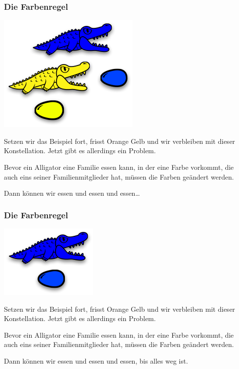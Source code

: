 \documentclass{beamer}
\begin{document}

\begin{frame}
\frametitle{Die Farbenregel}

\begin{center}
\includegraphics[scale=0.35]{colorrule_4.png} 
\end{center}

Setzen wir das Beispiel fort, frisst Orange Gelb und wir verbleiben mit dieser Konstellation.
Jetzt gibt es allerdings ein Problem.

Bevor ein Alligator eine Familie essen kann, in der eine Farbe vorkommt, die auch eins seiner Familienmitglieder hat, müssen die Farben geändert werden.

Dann können wir essen und essen und essen\dots

\end{frame}


\begin{frame}
\frametitle{Die Farbenregel}

\begin{center}
\includegraphics[scale=0.45]{colorrule_5.png} 
\end{center}

Setzen wir das Beispiel fort, frisst Orange Gelb und wir verbleiben mit dieser Konstellation.
Jetzt gibt es allerdings ein Problem.

Bevor ein Alligator eine Familie essen kann, in der eine Farbe vorkommt, die auch eins seiner Familienmitglieder hat, müssen die Farben geändert werden.

Dann können wir essen und essen und essen, bis alles weg ist.

\end{frame}
\end{document}
